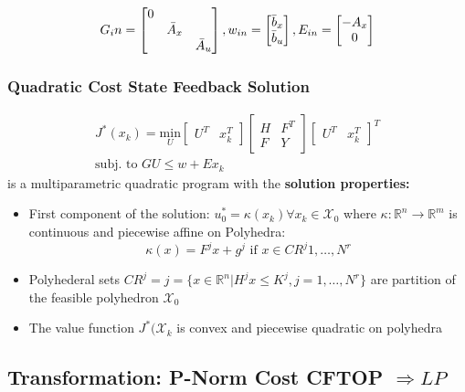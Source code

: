 \begin{enumerate}
\begin{gather*}
        G_in = \begin{bmatrix}
        0 & & \\ 
        & \Bar{A}_x & \\
        & & \Bar{A}_u
        \end{bmatrix}, w_{in} = \begin{bmatrix}
            \Bar{b}_x\\ \Bar{b}_u
        \end{bmatrix}, E_{in} = \begin{bmatrix}
        -A_x \\ 0
        \end{bmatrix}
    \end{gather*}
\end{enumerate}
\subsubsection{Quadratic Cost State Feedback Solution}
\begin{gather*}
J^*(x_k) = \underset{U}{\textrm{min}} 
    \begin{bmatrix}
    U^T & x_k^T
    \end{bmatrix} \begin{bmatrix}
    H & F^T \\ F & Y
    \end{bmatrix} \begin{bmatrix}
    U^T & x_k^T
    \end{bmatrix}^T \\ 
    \textrm{subj. to } GU \leq w + E x_k \end{gather*}
    is a multiparametric quadratic program with the \textbf{solution properties: } \begin{itemize}
        \item First component of the solution: $u_0^* = \kappa(x_k) \forall x_k \in \mathcal{X}_0$ where $\kappa: \mathbb{R}^n \rightarrow\mathbb{R}^m$ is continuous and piecewise affine on Polyhedra: \[\kappa(x) = F^jx+g^j \textrm{ if }x\in CR^j  1, \dotsc, N^r\]
        \item Polyhederal sets $CR^j = j= \{x\in \mathbb{R}^n|H^jx\leq K^j, j = 1, \dotsc, N^r\}$ are partition of the feasible polyhedron $\mathcal{X}_0$
        \item The value function $J^*(\mathcal{X}_k$ is convex and piecewise quadratic on polyhedra
    \end{itemize}
\subsection{Transformation: P-Norm Cost CFTOP $\Rightarrow LP$}
